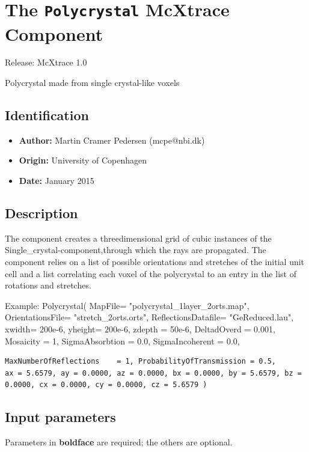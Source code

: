 \section{The \texttt{Polycrystal} McXtrace Component}
Release: McXtrace 1.0

Polycrystal made from single crystal-like voxels

\subsection*{Identification}
\begin{itemize}
  \item \textbf{Author:} Martin Cramer Pedersen (mcpe@nbi.dk)
  \item \textbf{Origin:} University of Copenhagen
  \item \textbf{Date:} January 2015
\end{itemize}

\subsection*{Description}
The component creates a threedimensional grid of cubic instances of the Single\_crystal-component,through which the rays are propagated. The component relies on a list of possible orientations and stretches of the initial unit cell and a list correlating each voxel of the polycrystal to an entry in the list of rotations and stretches.

Example: Polycrystal( MapFile= "polycrystal\_1layer\_2orts.map", OrientationsFile= "stretch\_2orts.orts", ReflectionsDatafile= "GeReduced.lau", xwidth= 200e-6, yheight= 200e-6, zdepth = 50e-6, DeltadOverd = 0.001, Mosaicity = 1, SigmaAbsorbtion = 0.0, SigmaIncoherent = 0.0,

\begin{verbatim}
MaxNumberOfReflections    = 1, ProbabilityOfTransmission = 0.5,
ax = 5.6579, ay = 0.0000, az = 0.0000, bx = 0.0000, by = 5.6579, bz = 0.0000, cx = 0.0000, cy = 0.0000, cz = 5.6579 )
\end{verbatim}

\subsection*{Input parameters}
Parameters in \textbf{boldface} are required; the others are optional.

